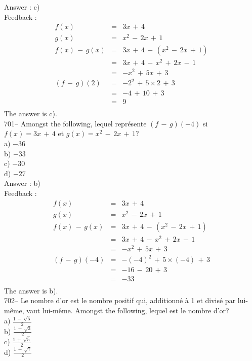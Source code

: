 \documentclass[letterpaper, 12pt]{article}
\begin{document}
Answer : c)\\

Feedback : \\
\begin{eqnarray*}
f(x)&=&3x\,+\,4\\
g(x)&=&x^{2}\,-\,2x\,+\,1\\
f(x)\,-\,g(x)&=&3x\,+\,4\,-\,(x^{2}\,-\,2x\,+\,1)\\
&=&3x\,+\,4\,-\,x^{2}\,+\,2x\,-\,1\\
&=&-x^{2}\,+\,5x\,+\,3\\
(f\,-\,g)(2)&=& - 2^{2}\,+\,5\times2\,+\,3\\
&=&-4\,+\,10\,+\,3\\
&=&9\\
\end{eqnarray*}
The answer is c).\\

701-- Amongst the following, lequel repr\'esente $(f\,-\,g)(-4)$
si $f(x)=3x\,+\,4$ et $g(x)=x^{2}\,-\,2x\,+\,1$?\\
a) $-36$\\
b) $-33$\\
c) $-30$\\
d) $-27$\\

Answer : b)\\

Feedback : \\
\begin{eqnarray*}
f(x)&=&3x\,+\,4\\
g(x)&=&x^{2}\,-\,2x\,+\,1\\
f(x)\,-\,g(x)&=&3x\,+\,4\,-\,(x^{2}\,-\,2x\,+\,1)\\
&=&3x\,+\,4\,-\,x^{2}\,+\,2x\,-\,1\\
&=&-x^{2}\,+\,5x\,+\,3\\
(f\,-\,g)(-4)&=& - (-4)^{2}\,+\,5\times(-4)\,+\,3\\
&=&-16\,-\,20\,+\,3\\
&=&-33\\
\end{eqnarray*}
The answer is b).\\

702-- Le nombre d'or est le nombre positif qui, additionn\'e \`a 1 et
divis\'e par lui-m\^eme, vaut lui-m\^eme.  Amongst the following,
lequel est le nombre d'or?\\
a) $\frac{1\,-\,\sqrt{5}}{2}$\\
b) $\frac{1\,+\,\sqrt{3}}{2}$\\
c) $\frac{1\,+\,\sqrt{5}}{2}$\\
d) $\frac{1\,+\,\sqrt{7}}{2}$\\
\end{document}
